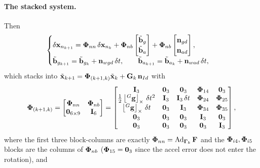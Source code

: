 \paragraph{The stacked system.} Then
\begin{align}
\begin{cases}
\delta\vect{x}_{n_{k+1}} = \vect{\Phi}_{nn}\,\delta\vect{x}_{n_k} + \vect{\Phi}_{nb}\begin{bmatrix} \tilde{\vect{b}}_g \\ \tilde{\vect{b}}_a \end{bmatrix} + \vect{\Phi}_{nb}\begin{bmatrix} \vect{n}_{gd} \\ \vect{n}_{ad} \end{bmatrix}, \\[8pt]
\tilde{\vect{b}}_{g_{k+1}} = \tilde{\vect{b}}_{g_k} + \vect{n}_{wgd}\,\delta t, \qquad
\tilde{\vect{b}}_{a_{k+1}} = \tilde{\vect{b}}_{a_k} + \vect{n}_{wad}\,\delta t,
\end{cases}
\end{align}
which stacks into $\tilde{\vect{x}}_{k+1} = \vect{\Phi}_{(k+1,k)}\tilde{\vect{x}}_k + \vect{G}_k\,\vect{n}_{Id}$ with
\begin{align}
\vect{\Phi}_{(k+1,k)} =
\begin{bmatrix}
\vect{\Phi}_{nn} & \vect{\Phi}_{nb} \\
\vect{0}_{6\times9} & \vect{I}_6
\end{bmatrix}
=
\begin{bmatrix}
\vect{I}_3 & \vect{0}_3 & \vect{0}_3 & \vect{\Phi}_{14} & \vect{0}_3 \\
\frac{1}{2}\skewsym{{}^{G}\vect{g}}\,\delta t^2 & \vect{I}_3 & \vect{I}_3\,\delta t & \vect{\Phi}_{24} & \vect{\Phi}_{25} \\
\skewsym{{}^{G}\vect{g}}\,\delta t & \vect{0}_3 & \vect{I}_3 & \vect{\Phi}_{34} & \vect{\Phi}_{35} \\
\vect{0}_3 & \vect{0}_3 & \vect{0}_3 & \vect{I}_3 & \vect{0}_3 \\
\vect{0}_3 & \vect{0}_3 & \vect{0}_3 & \vect{0}_3 & \vect{I}_3
\end{bmatrix},
\label{eq:lec05-Phi-se23}
\end{align}
where the first three block-columns are exactly $\vect{\Phi}_{nn} = \Ad_{\vect{\Gamma}_k}\vect{F}$ and the $\vect{\Phi}_{i4},\vect{\Phi}_{i5}$ blocks are the columns of $\vect{\Phi}_{nb}$ ($\vect{\Phi}_{15} = \vect{0}_3$ since the accel error does not enter the rotation), and
